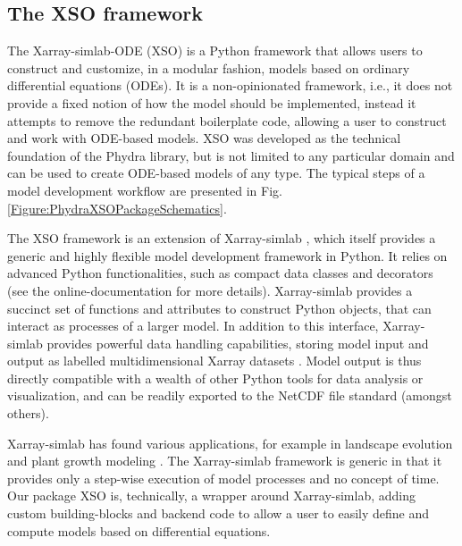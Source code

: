 \documentclass[journal abbreviation, manuscript]{copernicus}
\begin{document}

\subsection{The XSO framework} \label{Section:XSOFramework}


The Xarray-simlab-ODE (XSO) is a Python framework that allows users to construct and customize, in a modular fashion, models based on ordinary differential equations (ODEs). It is a non-opinionated framework, i.e., it does not provide a fixed notion of how the model should be implemented, instead it attempts to remove the redundant boilerplate code, allowing a user to construct and work with ODE-based models. XSO was developed as the technical foundation of the Phydra library, but is not limited to any particular domain and can be used to create ODE-based models of any type. The typical steps of a model development workflow are presented in Fig. \ref{Figure:PhydraXSOPackageSchematics}.

The XSO framework is an extension of Xarray-simlab \citep{Bovy2018Xarray-simlab:Interactively, Bovy2021Benbovy/xarray-simlab:0.5.0}, which itself provides a generic and highly flexible model development framework in Python. It relies on advanced Python functionalities, such as compact data classes and decorators (see the online-documentation for more details). Xarray-simlab provides a succinct set of functions and attributes to construct Python objects, that can interact as processes of a larger model. In addition to this interface, Xarray-simlab provides powerful data handling capabilities, storing model input and output as labelled multidimensional Xarray datasets \citep{Hoyer2017Xarray:Python}. Model output is thus directly compatible with a wealth of other Python tools for data analysis or visualization, and can be readily exported to the NetCDF file standard (amongst others).

Xarray-simlab has found various applications, for example in landscape evolution \citep{Bovy2021Fastscape-lem/fastscape:V0.1.0beta3} and plant growth modeling \citep{Vaillant2022TowardsDevelopment}. The Xarray-simlab framework is generic in that it provides only a step-wise execution of model processes and no concept of time. Our package XSO is, technically, a wrapper around Xarray-simlab, adding custom building-blocks and backend code to allow a user to easily define and compute models based on differential equations.
\end{document}
